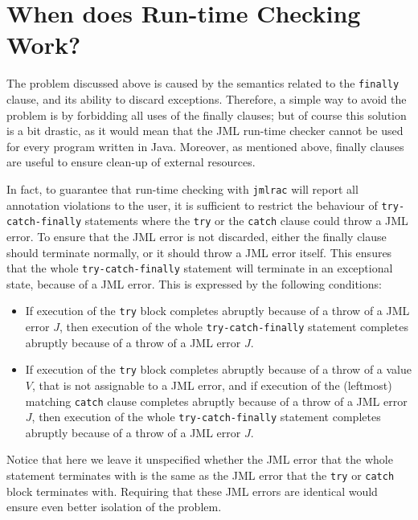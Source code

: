 \documentclass[]{llncs}
\begin{document}
\section{When does Run-time Checking Work?}\label{SecAvoiding} 

The problem discussed above is caused by the semantics related to the
\texttt{finally} clause, and its ability to discard
exceptions. Therefore, a simple way to avoid the problem is by
forbidding all uses of the finally clauses; but of course this
solution is a bit drastic, as it would mean that the JML run-time checker
cannot be used for every program written in Java. Moreover, as
mentioned above, finally clauses are useful to ensure clean-up of
external resources. 

In fact, to guarantee that run-time checking with \texttt{jmlrac} will
report all annotation violations to the user, it is sufficient to
restrict the behaviour of \texttt{try-catch-finally} statements where
the \texttt{try} or the \texttt{catch} clause could throw a JML
error. To ensure that the JML error is not discarded, either the
finally clause should terminate normally, or it should throw a JML
error itself. This ensures that the whole \texttt{try-catch-finally}
statement will terminate in an exceptional state, because of a JML
error. This is expressed by the following conditions: 

\begin{itemize}
\item If execution of the \texttt{try} block completes abruptly 
because of a throw of a JML error \(J\), then execution of the whole
\texttt{try-catch-finally} statement completes abruptly because of a 
throw of a JML error \(J\).
\item If execution of the \texttt{try} block completes abruptly
because of a throw of a value \(V\), that is not assignable to a JML
error, and if execution of the (leftmost) matching \texttt{catch}
clause completes abruptly because of a throw of a JML error \(J\),
then execution of the whole \texttt{try-catch-finally} statement
completes abruptly because of a throw of a JML error \(J\).
\end{itemize}

Notice that here we leave it unspecified whether the JML error that
the whole statement terminates with is the same as the JML error that
the \texttt{try} or \texttt{catch} block terminates with. Requiring
that these JML errors are identical would ensure even better isolation
of the problem.
\end{document}
